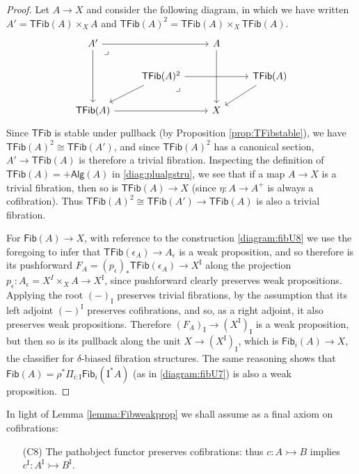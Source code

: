 \documentclass[11pt,reqno]{amsart}
\newcommand{\cof}{\ensuremath{\rightarrowtail}}
\renewcommand{\to}{\ensuremath{\rightarrow}}
\newcommand{\I}{\ensuremath{\mathrm{I}}}
\newcommand{\Fib}{\ensuremath{\mathsf{Fib}}}
\newcommand{\TFib}{\ensuremath{\mathsf{TFib}}}
\theoremstyle{remark}
\theoremstyle{definition}
\newcommand{\pbmark}{\ar[dr, phantom, "\lrcorner" very near start, shift right=.5ex]}	%
\begin{document}
%
\begin{proof}
Let $A\to X$ and consider the following diagram, in which we have written $A' = \TFib(A)\times_X A$ and $\TFib(A)^2 = \TFib(A)\times_X \TFib(A)$.
%
\begin{equation}\label{diagram:TFibweakprop}
\begin{tikzcd}
A' \ar[dd]  \ar[rr] \pbmark && A \ar[dd]  \\
& \TFib(A)^2 \ar[ld] \ar[rr]  \pbmark && \TFib(A) \ar[ld] \\
\TFib(A) \ar[rr] && X
\end{tikzcd}
\end{equation}
Since $\TFib$ is stable under pullback (by Proposition \ref{prop:TFibstable}), we have $\TFib(A)^2 \cong \TFib(A')$, and since $\TFib(A)^2$ has a canonical section, $A' \to \TFib(A)$ is therefore a trivial fibration.  Inspecting the definition of $\TFib(A) = +\mathsf{Alg}(A)$ in \eqref{diag:plualgstru}, we see that if a map $A\to X$ is a trivial fibration, then so is $\TFib(A)\to X$ (since $\eta : A\to A^+$ is always a cofibration). Thus $\TFib(A)^2 \cong \TFib(A') \to\TFib(A)$ is also a trivial fibration.

For $\Fib(A)\to X$, with reference to the construction \eqref{diagram:fibU8} we use the foregoing to infer that $\TFib(\epsilon_A) \to A_\epsilon$ is a weak proposition, and so therefore is its pushforward $F_A = (p_\epsilon)_*\TFib(\epsilon_A)\to X^\I$ along the projection $p_\epsilon : A_\epsilon = X^I\times_X A \to X^\I$, since pushforward clearly preserves weak propositions.  Applying the root $(-)_\I$ preserves trivial fibrations, by the assumption that its left adjoint $(-)^\I$ preserves cofibrations, and so, as a right adjoint, it also preserves weak propositions. Therefore $(F_A)_\I \to (X^\I)_\I$ is a weak proposition, but then so is its pullback along the unit $X\to (X^\I)_\I$, which is $\Fib_i(A)\to X$, the classifier for $\delta$-biased fibration structures.  The same reasoning shows that $\Fib(A) = \rho^*\Pi_{i:\I}\Fib_i(\I^*A)$ (as in \eqref{diagram:fibU7}) is also a weak proposition.
\end{proof}

In light of Lemma \ref{lemma:Fibweakprop} we shall assume as a final axiom on cofibrations:
 
\begin{enumerate}
\item[(C8)] The pathobject functor preserves cofibrations: thus $c:A \cof B$ implies $c^\I:A^\I \cof B^\I$.
\end{enumerate}
\end{document}
